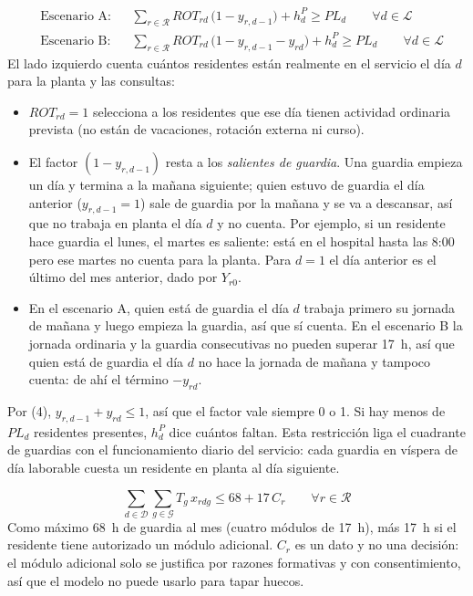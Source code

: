 \begin{align*}
&\text{Escenario A:} && \sum_{r \in \mathcal{R}} ROT_{rd}\,\bigl(1 - y_{r,d-1}\bigr) + h^{P}_{d} \ge PL_d \qquad \forall d \in \mathcal{L}\\
&\text{Escenario B:} && \sum_{r \in \mathcal{R}} ROT_{rd}\,\bigl(1 - y_{r,d-1} - y_{rd}\bigr) + h^{P}_{d} \ge PL_d \qquad \forall d \in \mathcal{L}
\end{align*}
El lado izquierdo cuenta cuántos residentes están realmente en el servicio el día $d$ para la planta y las consultas:
\begin{itemize}
  \item $ROT_{rd} = 1$ selecciona a los residentes que ese día tienen actividad ordinaria prevista (no están de vacaciones, rotación externa ni curso).
  \item El factor $(1 - y_{r,d-1})$ resta a los \emph{salientes de guardia}. Una guardia empieza un día y termina a la mañana siguiente; quien estuvo de guardia el día anterior ($y_{r,d-1} = 1$) sale de guardia por la mañana y se va a descansar, así que no trabaja en planta el día $d$ y no cuenta. Por ejemplo, si un residente hace guardia el lunes, el martes es saliente: está en el hospital hasta las 8:00 pero ese martes no cuenta para la planta. Para $d = 1$ el día anterior es el último del mes anterior, dado por $Y_{r0}$.
  \item En el escenario A, quien está de guardia el día $d$ trabaja primero su jornada de mañana y luego empieza la guardia, así que sí cuenta. En el escenario B la jornada ordinaria y la guardia consecutivas no pueden superar 17~h, así que quien está de guardia el día $d$ no hace la jornada de mañana y tampoco cuenta: de ahí el término $-y_{rd}$.
\end{itemize}
Por (4), $y_{r,d-1} + y_{rd} \le 1$, así que el factor vale siempre 0 o 1. Si hay menos de $PL_d$ residentes presentes, $h^{P}_{d}$ dice cuántos faltan. Esta restricción liga el cuadrante de guardias con el funcionamiento diario del servicio: cada guardia en víspera de día laborable cuesta un residente en planta al día siguiente.

\[
\sum_{d \in \mathcal{D}} \sum_{g \in \mathcal{G}} T_g\, x_{rdg} \le 68 + 17\, C_r \qquad \forall r \in \mathcal{R}
\]
Como máximo 68~h de guardia al mes (cuatro módulos de 17~h), más 17~h si el residente tiene autorizado un módulo adicional. $C_r$ es un dato y no una decisión: el módulo adicional solo se justifica por razones formativas y con consentimiento, así que el modelo no puede usarlo para tapar huecos.

